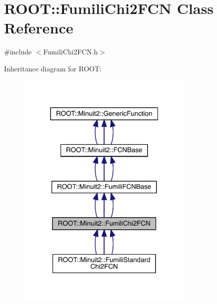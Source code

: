\hypertarget{classROOT_1_1Minuit2_1_1FumiliChi2FCN}{}\section{R\+O\+OT\+:\+:Fumili\+Chi2\+F\+CN Class Reference}
\label{classROOT_1_1Minuit2_1_1FumiliChi2FCN}


{\ttfamily \#include $<$Fumili\+Chi2\+F\+C\+N.\+h$>$}



Inheritance diagram for R\+O\+OT\+:
\nopagebreak
\begin{figure}[H]
\begin{center}
\leavevmode
\includegraphics[width=240pt]{da/d72/classROOT_1_1Minuit2_1_1FumiliChi2FCN__inherit__graph}
\end{center}
\end{figure}


